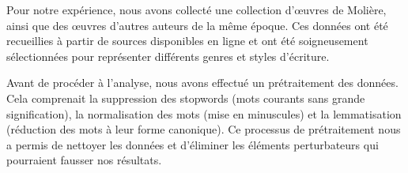 \vspace{\baselineskip}
Pour notre expérience, nous avons collecté une collection d'œuvres de Molière,
ainsi que des œuvres d'autres auteurs de la même époque. Ces données ont été
recueillies à partir de sources disponibles en ligne et ont été soigneusement
sélectionnées pour représenter différents genres et styles d'écriture.

Avant de procéder à l'analyse, nous avons effectué un prétraitement des données.
Cela comprenait la suppression des stopwords (mots courants sans grande
signification), la normalisation des mots (mise en minuscules) et la
lemmatisation (réduction des mots à leur forme canonique). Ce processus de
prétraitement nous a permis de nettoyer les données et d'éliminer les éléments
perturbateurs qui pourraient fausser nos résultats.
